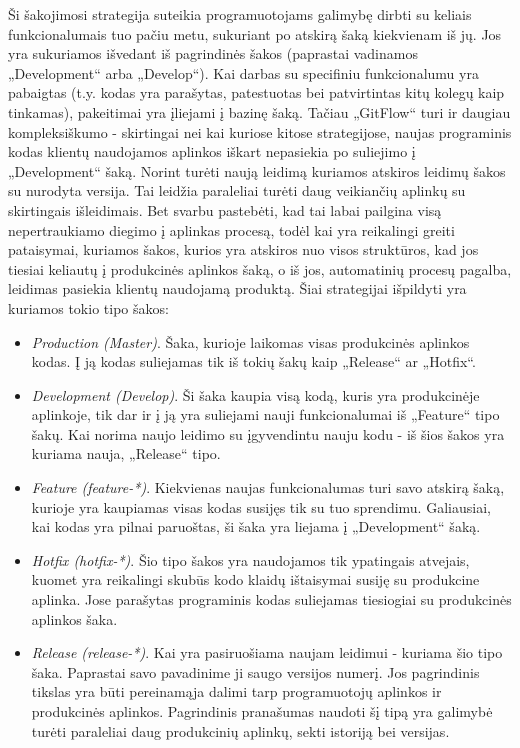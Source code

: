 \documentclass{VUMIFPSkursinis}
\begin{document}

Ši šakojimosi strategija suteikia programuotojams galimybę dirbti su keliais funkcionalumais tuo pačiu metu, sukuriant po atskirą šaką kiekvienam iš jų. Jos yra sukuriamos išvedant iš pagrindinės šakos (paprastai vadinamos „Development“ arba „Develop“). Kai darbas su specifiniu funkcionalumu yra pabaigtas (t.y. kodas yra parašytas, patestuotas bei patvirtintas kitų kolegų kaip tinkamas), pakeitimai yra įliejami į bazinę šaką. Tačiau „GitFlow“ turi ir daugiau kompleksiškumo - skirtingai nei kai kuriose kitose strategijose, naujas programinis kodas klientų naudojamos aplinkos iškart nepasiekia po suliejimo į „Development“ šaką. Norint turėti naują leidimą kuriamos atskiros leidimų šakos su nurodyta versija. Tai leidžia paraleliai turėti daug veikiančių aplinkų su skirtingais išleidimais. Bet svarbu pastebėti, kad tai labai pailgina visą nepertraukiamo diegimo į aplinkas procesą, todėl kai yra reikalingi greiti pataisymai, kuriamos šakos, kurios yra atskiros nuo visos struktūros, kad jos tiesiai keliautų į produkcinės aplinkos šaką, o iš jos, automatinių procesų pagalba, leidimas pasiekia klientų naudojamą produktą. Šiai strategijai išpildyti yra kuriamos tokio tipo šakos:

\begin{itemize}
  \item \textit{Production (Master)}. Šaka, kurioje laikomas visas produkcinės aplinkos kodas. Į ją kodas suliejamas tik iš tokių šakų kaip „Release“ ar „Hotfix“.
  
  \item \textit{Development (Develop)}. Ši šaka kaupia visą kodą, kuris yra produkcinėje aplinkoje, tik dar ir į ją yra suliejami nauji funkcionalumai iš „Feature“ tipo šakų. Kai norima naujo leidimo su įgyvendintu nauju kodu - iš šios šakos yra kuriama nauja, „Release“ tipo.

  \item \textit{Feature (feature-*)}. Kiekvienas naujas funkcionalumas turi savo atskirą šaką, kurioje yra kaupiamas visas kodas susijęs tik su tuo sprendimu. Galiausiai, kai kodas yra pilnai paruoštas, ši šaka yra liejama į „Development“ šaką.

  \item \textit{Hotfix (hotfix-*)}. Šio tipo šakos yra naudojamos tik ypatingais atvejais, kuomet yra reikalingi skubūs kodo klaidų ištaisymai susiję su produkcine aplinka. Jose parašytas programinis kodas suliejamas tiesiogiai su produkcinės aplinkos šaka.

  
  \item \textit{Release (release-*)}. Kai yra pasiruošiama naujam leidimui - kuriama šio tipo šaka. Paprastai savo pavadinime ji saugo versijos numerį. Jos pagrindinis tikslas yra būti pereinamąja dalimi tarp programuotojų aplinkos ir produkcinės aplinkos. Pagrindinis pranašumas naudoti šį tipą yra galimybė turėti paraleliai daug produkcinių aplinkų, sekti istoriją bei versijas.
\end{itemize}
\end{document}
